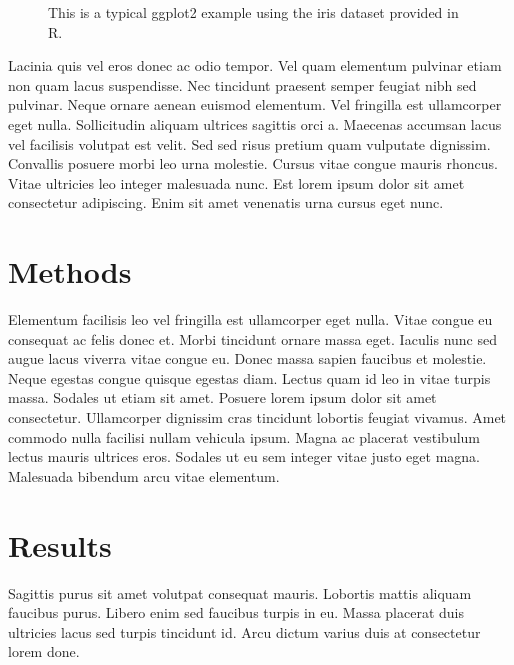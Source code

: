 \documentclass[article,30pt,extrafontsizes]{memoir}
\begin{document}
\begin{multicols*}{3}
{\begin{figure}
{}

\caption{This is a typical ggplot2 example using the iris dataset provided in R.}\label{fig:unnamed-chunk-3}
\end{figure}

Lacinia quis vel eros donec ac odio tempor. Vel quam elementum pulvinar
etiam non quam lacus suspendisse. Nec tincidunt praesent semper feugiat
nibh sed pulvinar. Neque ornare aenean euismod elementum. Vel fringilla
est ullamcorper eget nulla. Sollicitudin aliquam ultrices sagittis orci
a. Maecenas accumsan lacus vel facilisis volutpat est velit. Sed sed
risus pretium quam vulputate dignissim. Convallis posuere morbi leo urna
molestie. Cursus vitae congue mauris rhoncus. Vitae ultricies leo
integer malesuada nunc. Est lorem ipsum dolor sit amet consectetur
adipiscing. Enim sit amet venenatis urna cursus eget nunc.

\section{Methods}\label{methods}

Elementum facilisis leo vel fringilla est ullamcorper eget nulla. Vitae
congue eu consequat ac felis donec et. Morbi tincidunt ornare massa
eget. Iaculis nunc sed augue lacus viverra vitae congue eu. Donec massa
sapien faucibus et molestie. Neque egestas congue quisque egestas diam.
Lectus quam id leo in vitae turpis massa. Sodales ut etiam sit amet.
Posuere lorem ipsum dolor sit amet consectetur. Ullamcorper dignissim
cras tincidunt lobortis feugiat vivamus. Amet commodo nulla facilisi
nullam vehicula ipsum. Magna ac placerat vestibulum lectus mauris
ultrices eros. Sodales ut eu sem integer vitae justo eget magna.
Malesuada bibendum arcu vitae elementum.

\section{Results}\label{results}

Sagittis purus sit amet volutpat consequat mauris. Lobortis mattis
aliquam faucibus purus. Libero enim sed faucibus turpis in eu. Massa
placerat duis ultricies lacus sed turpis tincidunt id. Arcu dictum
varius duis at consectetur lorem done.

\begin{figure}


\end{figure}}
\end{multicols*}
\end{document}
